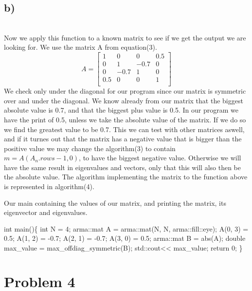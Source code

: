 \documentclass[english,notitlepage]{revtex4-1}  %
\begin{document}
\subsection*{b)}\
\\
Now we apply this function to a known matrix to see if we get the output we are looking for. We use the matrix A from equation(3). 
\begin{equation}
A = \begin{bmatrix}
1 & 0 & 0 & 0.5\\
0 & 1 & -0.7 & 0\\
0 & -0.7 & 1 & 0\\
0.5 & 0 & 0 & 1\\
\end{bmatrix}
\end{equation}
We check only under the diagonal for our program since our matrix is symmetric over and under the diagonal. We know already from our matrix that the biggest absolute value is 0.7, and that the biggest plus value is 0.5. In our program we have the print of 0.5, unless we take the absolute value of the matrix. If we do so we find the greatest value to be 0.7. This we can test with other matrices aswell, and if it turnes out that the matrix has a negative value that is bigger than the positive value we may change the algorithm(3) to contain $m = A(A_n.rows - 1, 0)$, to have the biggest negative value. Otherwise we will have the same result in eigenvalues and vectors, only that this will also then be the absolute value. The algorithm implementing the matrix to the function above is represented in algorithm(4). 
\begin{algorithm}[H]
    \caption{Our main containing the values of our matrix, and printing the matrix, its eigenvector and eigenvalues.}\label{av_lik_lv}
    \begin{algorithmic}
    	\State int main()\{
	\State int N = 4; 
	\State arma::mat A = arma::mat(N, N, arma::fill::eye);
        \State A(0, 3) = 0.5; A(1, 2) = -0.7; A(2, 1) = -0.7; A(3, 0) = 0.5; 
        \State arma::mat B = abs(A); 
        \State double max\_value = max\_offdiag\_symmetric(B);
        \State std::cout<< max\_value;
 	\State return 0;
	\State \}
    \end{algorithmic}
\end{algorithm}

\section*{Problem 4}
\end{document}
